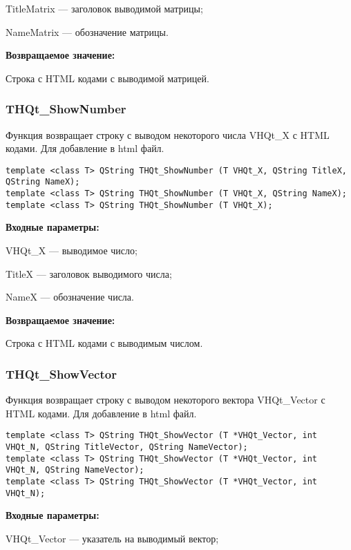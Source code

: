 \documentclass[a4paper,12pt]{article}
\begin{document}
    TitleMatrix --- заголовок выводимой матрицы;
 
    NameMatrix --- обозначение матрицы.

\textbf{Возвращаемое значение:}

Строка с HTML кодами с выводимой матрицей.


\subsubsection{THQt\_ShowNumber}\label{THQt_ShowNumber}

Функция возвращает строку с выводом некоторого числа VHQt\_X с HTML кодами. Для добавление в html файл.


\begin{lstlisting}[label=code_syntax_THQt_ShowNumber,caption=Синтаксис]
template <class T> QString THQt_ShowNumber (T VHQt_X, QString TitleX, QString NameX);
template <class T> QString THQt_ShowNumber (T VHQt_X, QString NameX);
template <class T> QString THQt_ShowNumber (T VHQt_X);
\end{lstlisting}

\textbf{Входные параметры:}

VHQt\_X --- выводимое число;
 
    TitleX --- заголовок выводимого числа;
 
    NameX --- обозначение числа.

\textbf{Возвращаемое значение:}

Строка с HTML кодами с выводимым числом.


\subsubsection{THQt\_ShowVector}\label{THQt_ShowVector}

Функция возвращает строку с выводом некоторого вектора VHQt\_Vector с HTML кодами. Для добавление в html файл.


\begin{lstlisting}[label=code_syntax_THQt_ShowVector,caption=Синтаксис]
template <class T> QString THQt_ShowVector (T *VHQt_Vector, int VHQt_N, QString TitleVector, QString NameVector);
template <class T> QString THQt_ShowVector (T *VHQt_Vector, int VHQt_N, QString NameVector);
template <class T> QString THQt_ShowVector (T *VHQt_Vector, int VHQt_N);
\end{lstlisting}

\textbf{Входные параметры:}

VHQt\_Vector --- указатель на выводимый вектор;
 
\end{document}
